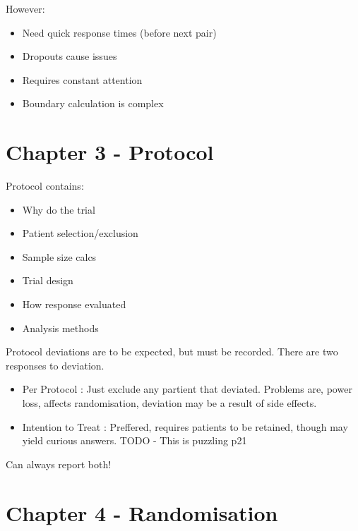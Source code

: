 \documentclass[
  letterpaper,
  DIV=11,
  numbers=noendperiod]{scrreprt}
\providecommand{\tightlist}{%
  \setlength{\itemsep}{0pt}\setlength{\parskip}{0pt}}\usepackage{longtable,booktabs,array}
\begin{document}
However:

\begin{itemize}
\tightlist
\item
  Need quick response times (before next pair)
\item
  Dropouts cause issues
\item
  Requires constant attention
\item
  Boundary calculation is complex
\end{itemize}


\hypertarget{chapter-3---protocol}{%
\chapter{Chapter 3 - Protocol}\label{chapter-3---protocol}}

Protocol contains:

\begin{itemize}
\tightlist
\item
  Why do the trial
\item
  Patient selection/exclusion
\item
  Sample size calcs
\item
  Trial design
\item
  How response evaluated
\item
  Analysis methods
\end{itemize}

Protocol deviations are to be expected, but must be recorded. There are
two responses to deviation.

\begin{itemize}
\tightlist
\item
  Per Protocol : Just exclude any partient that deviated. Problems are,
  power loss, affects randomisation, deviation may be a result of side
  effects.
\item
  Intention to Treat : Preffered, requires patients to be retained,
  though may yield curious answers. TODO - This is puzzling p21
\end{itemize}

Can always report both!


\hypertarget{chapter-4---randomisation}{%
\chapter{Chapter 4 - Randomisation}\label{chapter-4---randomisation}}
\end{document}
